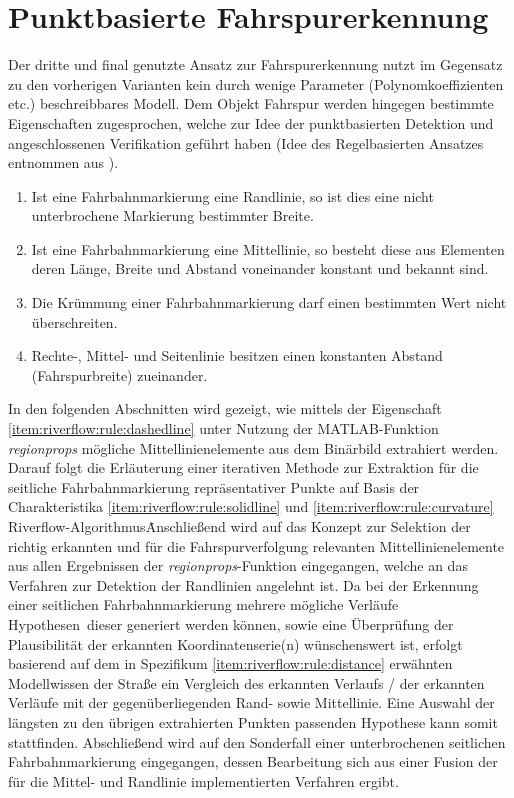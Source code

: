 \chapter{Punktbasierte Fahrspurerkennung \dcsecondauthorshort} 
\label{sec:fahrspurerkennung:riverflow}

Der dritte und final genutzte Ansatz zur Fahrspurerkennung nutzt im Gegensatz zu den vorherigen Varianten kein durch wenige Parameter (Polynomkoeffizienten etc.) beschreibbares Modell. Dem Objekt Fahrspur werden hingegen bestimmte Eigenschaften zugesprochen, welche zur Idee der punktbasierten Detektion und angeschlossenen Verifikation geführt haben (Idee des Regelbasierten Ansatzes entnommen aus \autocite[35-39]{drauschkeEchtzeitfaehigeStartpunktalgorithmenFuer2016}).
\begin{enumerate}
\item \label{item:riverflow:rule:solidline}
Ist eine Fahrbahnmarkierung eine Randlinie, so ist dies eine nicht unterbrochene Markierung bestimmter Breite.
\item \label{item:riverflow:rule:dashedline}
Ist eine Fahrbahnmarkierung eine Mittellinie, so besteht diese aus Elementen deren Länge, Breite und Abstand voneinander konstant und bekannt sind.
\item \label{item:riverflow:rule:curvature}
Die Krümmung einer Fahrbahnmarkierung darf einen bestimmten Wert nicht überschreiten.
\item \label{item:riverflow:rule:distance}
Rechte-, Mittel- und Seitenlinie besitzen einen konstanten Abstand (Fahrspurbreite) zueinander.
\end{enumerate}
In den folgenden Abschnitten wird gezeigt, wie mittels der Eigenschaft \ref{item:riverflow:rule:dashedline} unter Nutzung der MATLAB-Funktion \emph{regionprops} mögliche Mittellinienelemente aus dem Binärbild extrahiert werden. Darauf folgt die Erläuterung einer iterativen Methode zur Extraktion für die seitliche Fahrbahnmarkierung repräsentativer Punkte auf Basis der Charakteristika \ref{item:riverflow:rule:solidline} und \ref{item:riverflow:rule:curvature} \glqq Riverflow-Algorithmus\grqq\. Anschließend wird auf das Konzept zur Selektion der richtig erkannten und für die Fahrspurverfolgung relevanten Mittellinienelemente aus allen Ergebnissen der \emph{regionprops}-Funktion eingegangen, welche an das Verfahren zur Detektion der Randlinien angelehnt ist. Da bei der Erkennung einer seitlichen Fahrbahnmarkierung mehrere mögliche Verläufe \glqq Hypothesen\grqq\ dieser generiert werden können, sowie eine Überprüfung der Plausibilität der erkannten Koordinatenserie(n) wünschenswert ist, erfolgt basierend auf dem in Spezifikum \ref{item:riverflow:rule:distance} erwähnten Modellwissen der Straße ein Vergleich des erkannten Verlaufs / der erkannten Verläufe mit der gegenüberliegenden Rand- sowie Mittellinie. Eine Auswahl der längsten zu den übrigen extrahierten Punkten passenden Hypothese kann somit stattfinden. Abschließend wird auf den Sonderfall einer unterbrochenen seitlichen Fahrbahnmarkierung eingegangen, dessen Bearbeitung sich aus einer Fusion der für die Mittel- und Randlinie implementierten Verfahren ergibt.




